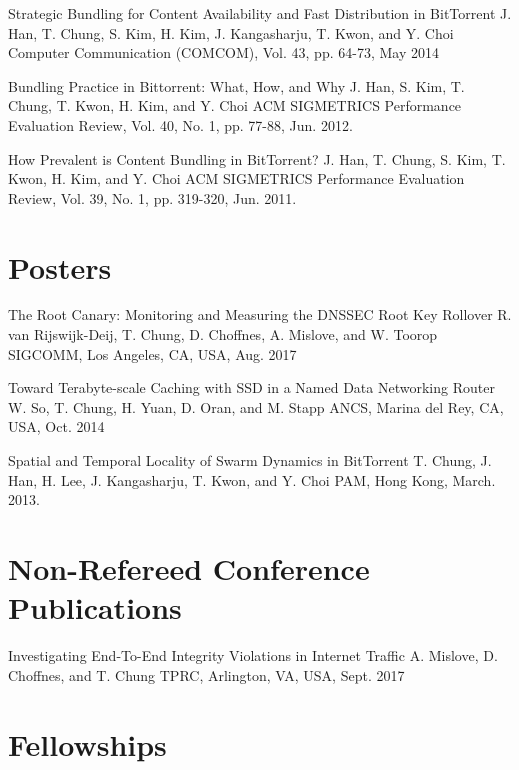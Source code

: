 \documentclass[11pt,a4paper,sans]{moderncv}        %
\begin{document}
\publication{}
{Strategic Bundling for Content Availability and Fast Distribution in BitTorrent}
{J. Han, \textcolor{colortj}{T. Chung}, S. Kim, H. Kim, J. Kangasharju, T. Kwon, and Y. Choi}
{Computer Communication (COMCOM), Vol. 43, pp. 64-73, May 2014}


\publication{}
{Bundling Practice in Bittorrent: What, How, and Why}
{J. Han, S. Kim, \textcolor{colortj}{T. Chung}, T. Kwon, H. Kim, and Y. Choi}
{ACM SIGMETRICS Performance Evaluation Review, Vol. 40, No. 1, pp. 77-88, Jun. 2012.}

\publication{}
{How Prevalent is Content Bundling in BitTorrent? }
{J. Han, \textcolor{colortj}{T. Chung}, S. Kim, T. Kwon, H. Kim, and Y. Choi}
{ACM SIGMETRICS Performance Evaluation Review, Vol. 39, No. 1, pp. 319-320, Jun. 2011.}

\section{Posters}
{The Root Canary: Monitoring and Measuring the DNSSEC Root Key Rollover}
{R. van Rijswijk-Deij, \textcolor{colortj}{T. Chung}, D. Choffnes, A. Mislove, and W. Toorop}
{SIGCOMM, Los Angeles, CA, USA, Aug. 2017}

{Toward Terabyte-scale Caching with SSD in a Named Data Networking Router}
{W. So, \textcolor{colortj}{T. Chung}, H. Yuan, D. Oran, and M. Stapp}
{ANCS, Marina del Rey, CA, USA, Oct. 2014 }

{Spatial and Temporal Locality of Swarm Dynamics in BitTorrent}
{\textcolor{colortj}{T. Chung}, J. Han, H. Lee, J. Kangasharju, T. Kwon, and Y. Choi}
{PAM, Hong Kong, March. 2013.}

\section{Non-Refereed Conference Publications}
{Investigating End-To-End Integrity Violations in Internet Traffic}
{A. Mislove, D. Choffnes, and \textcolor{colortj}{T. Chung}}
{TPRC, Arlington, VA, USA, Sept. 2017}

\section{Fellowships}
 {}{}{}{}{}
\end{document}
